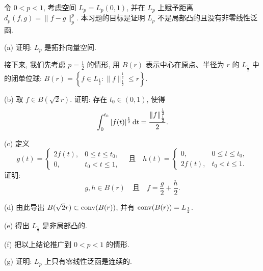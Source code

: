 \begin{exercise}[16]
    令 $0<p<1$, 考虑空间 $L_p=L_p(0,1)$, 并在 $L_p$ 上赋予距离 $d_{p}(f, g)=\|f-g\|_p^p$. 
    本习题的目标是证明 $L_p$ 不是局部凸的且没有非零线性泛函.

    (a) 证明: $L_p$ 是拓扑向量空间.

    接下来, 我们先考虑 $p=\frac{1}{2}$ 的情形, 用 $B(r)$ 表示中心在原点、半径为 $r$ 的 $L_{\frac{1}{2}}$ 中的闭单位球: 
    $B(r)=\left\{f \in L_{\frac{1}{2}}\colon \|f\|_{\frac{1}{2}}^{\frac{1}{2}} \leqslant r\right\}$.

    (b) 取 $f\in B(\sqrt{2}r)$. 证明: 存在 $t_0 \in(0,1)$, 使得
    \[
    \int_{0}^{t_0}|f(t)|^{\frac{1}{2}}\mathop{}\!\mathrm{d} t=\frac{\|f\|_{\frac{1}{2}}^{\frac{1}{2}}}{2}.
    \]

    (c) 定义
    \[g(t)=
    \begin{cases}
        2f(t), & 0\leqslant t\leqslant t_{0}, \\
        0, & t_{0}<t\leqslant 1,
    \end{cases}\quad\text{且}\quad 
    h(t)=\begin{cases}
        0, & 0 \leqslant t \leqslant t_{0}, \\
        2f(t), & t_{0}<t \leqslant 1.
    \end{cases}\]
    证明:
    \[g, h \in B(r) \quad \text{且} \quad f=\frac{g}{2}+\frac{h}{2}.\]

    (d) 由此导出 $B(\sqrt{2} r)\subset\operatorname{conv}(B(r))$, 并有 $\operatorname{conv}(B(r))=L_{\frac{1}{2}}$.

    (e) 得出 $L_{\frac{1}{2}}$ 是非局部凸的.

    (f) 把以上结论推广到 $0<p<1$ 的情形.

    (g) 证明: $L_{p}$ 上只有零线性泛函是连续的.
\end{exercise}

